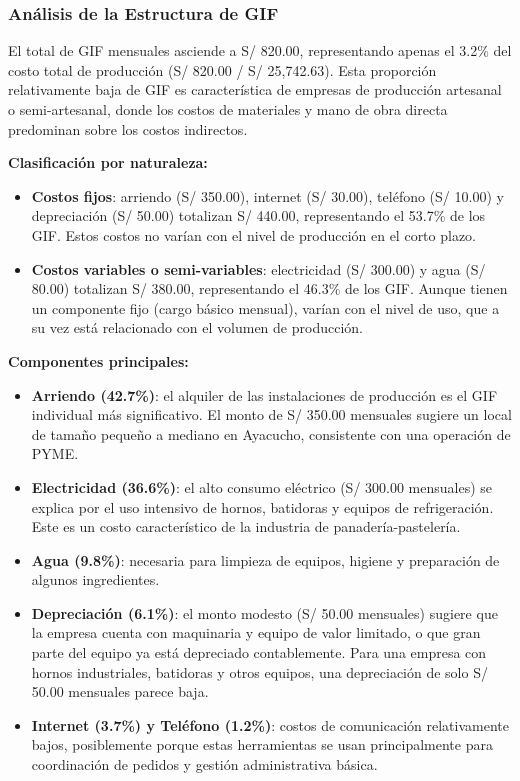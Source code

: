 \documentclass[
  stu,
  floatsintext,
  longtable,
  a4paper,
  nolmodern,
  notxfonts,
  notimes,
  12pt,
  colorlinks=true,linkcolor=blue,citecolor=blue,urlcolor=blue]{apa7}
\begin{document}
\subsubsection{Análisis de la Estructura de
GIF}\label{anuxe1lisis-de-la-estructura-de-gif}

El total de GIF mensuales asciende a S/ 820.00, representando apenas el
3.2\% del costo total de producción (S/ 820.00 / S/ 25,742.63). Esta
proporción relativamente baja de GIF es característica de empresas de
producción artesanal o semi-artesanal, donde los costos de materiales y
mano de obra directa predominan sobre los costos indirectos.

\textbf{Clasificación por naturaleza:}

\begin{itemize}
\item
  \textbf{Costos fijos}: arriendo (S/ 350.00), internet (S/ 30.00),
  teléfono (S/ 10.00) y depreciación (S/ 50.00) totalizan S/ 440.00,
  representando el 53.7\% de los GIF. Estos costos no varían con el
  nivel de producción en el corto plazo.
\item
  \textbf{Costos variables o semi-variables}: electricidad (S/ 300.00) y
  agua (S/ 80.00) totalizan S/ 380.00, representando el 46.3\% de los
  GIF. Aunque tienen un componente fijo (cargo básico mensual), varían
  con el nivel de uso, que a su vez está relacionado con el volumen de
  producción.
\end{itemize}

\textbf{Componentes principales:}

\begin{itemize}
\item
  \textbf{Arriendo (42.7\%)}: el alquiler de las instalaciones de
  producción es el GIF individual más significativo. El monto de S/
  350.00 mensuales sugiere un local de tamaño pequeño a mediano en
  Ayacucho, consistente con una operación de PYME.
\item
  \textbf{Electricidad (36.6\%)}: el alto consumo eléctrico (S/ 300.00
  mensuales) se explica por el uso intensivo de hornos, batidoras y
  equipos de refrigeración. Este es un costo característico de la
  industria de panadería-pastelería.
\item
  \textbf{Agua (9.8\%)}: necesaria para limpieza de equipos, higiene y
  preparación de algunos ingredientes.
\item
  \textbf{Depreciación (6.1\%)}: el monto modesto (S/ 50.00 mensuales)
  sugiere que la empresa cuenta con maquinaria y equipo de valor
  limitado, o que gran parte del equipo ya está depreciado
  contablemente. Para una empresa con hornos industriales, batidoras y
  otros equipos, una depreciación de solo S/ 50.00 mensuales parece
  baja.
\item
  \textbf{Internet (3.7\%) y Teléfono (1.2\%)}: costos de comunicación
  relativamente bajos, posiblemente porque estas herramientas se usan
  principalmente para coordinación de pedidos y gestión administrativa
  básica.
\end{itemize}
\end{document}
